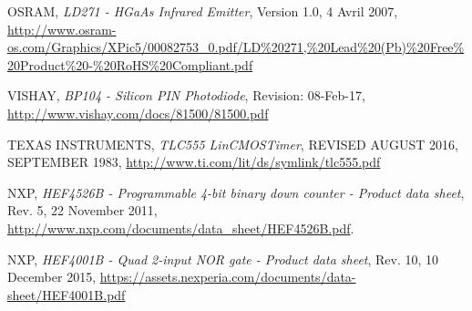 \documentclass[french]{layout/Report}
\begin{document}
\begin{thebibliography}{9}

	OSRAM,
	\textit{LD271 - HGaAs Infrared Emitter},
	Version 1.0,
	4 Avril 2007,
	\url{http://www.osram-os.com/Graphics/XPic5/00082753_0.pdf/LD%20271,%20Lead%20(Pb)%20Free%20Product%20-%20RoHS%20Compliant.pdf}

		VISHAY,
		\textit{BP104 - Silicon PIN Photodiode},
		Revision: 08-Feb-17,
		\url{http://www.vishay.com/docs/81500/81500.pdf}

		TEXAS INSTRUMENTS,
		\textit{TLC555 LinCMOS\texttrademark Timer},
		REVISED AUGUST 2016,
		SEPTEMBER 1983,
		\url{http://www.ti.com/lit/ds/symlink/tlc555.pdf}

		NXP,
		\textit{HEF4526B - Programmable 4-bit binary down counter - Product data sheet},
		Rev. 5,
		22 November 2011,
		\url{http://www.nxp.com/documents/data_sheet/HEF4526B.pdf}.

		NXP,
		\textit{HEF4001B - Quad 2-input NOR gate - Product data sheet},
		Rev. 10,
		10 December 2015,
		\url{https://assets.nexperia.com/documents/data-sheet/HEF4001B.pdf}

\end{thebibliography}
\end{document}
